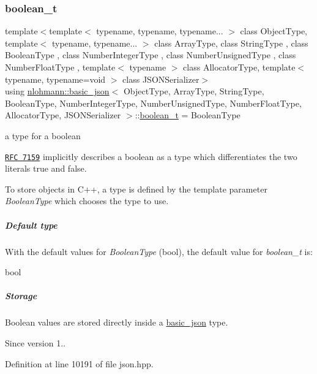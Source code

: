 \subsubsection{\texorpdfstring{boolean\+\_\+t}{boolean\_t}}
{\footnotesize\ttfamily template$<$template$<$ typename, typename, typename... $>$ class Object\+Type, template$<$ typename, typename... $>$ class Array\+Type, class String\+Type , class Boolean\+Type , class Number\+Integer\+Type , class Number\+Unsigned\+Type , class Number\+Float\+Type , template$<$ typename $>$ class Allocator\+Type, template$<$ typename, typename=void $>$ class J\+S\+O\+N\+Serializer$>$ \\
using \hyperlink{classnlohmann_1_1basic__json}{nlohmann\+::basic\+\_\+json}$<$ Object\+Type, Array\+Type, String\+Type, Boolean\+Type, Number\+Integer\+Type, Number\+Unsigned\+Type, Number\+Float\+Type, Allocator\+Type, J\+S\+O\+N\+Serializer $>$\+::\hyperlink{classnlohmann_1_1basic__json_a4c919102a9b4fe0d588af64801436082}{boolean\+\_\+t} =  Boolean\+Type}



a type for a boolean 

\href{http://rfc7159.net/rfc7159}{\tt R\+FC 7159} implicitly describes a boolean as a type which differentiates the two literals {\ttfamily true} and {\ttfamily false}.

To store objects in C++, a type is defined by the template parameter {\itshape Boolean\+Type} which chooses the type to use.

\subparagraph*{Default type}

With the default values for {\itshape Boolean\+Type} ({\ttfamily bool}), the default value for {\itshape boolean\+\_\+t} is\+:


\begin{DoxyCode}
\textcolor{keywordtype}{bool}
\end{DoxyCode}


\subparagraph*{Storage}

Boolean values are stored directly inside a \hyperlink{classnlohmann_1_1basic__json}{basic\+\_\+json} type.

\begin{DoxySince}{Since}
version 1.. 
\end{DoxySince}


Definition at line 10191 of file json.\+hpp.

\mbox{\label{classnlohmann_1_1basic__json_a41a70cf9993951836d129bb1c2b3126a}} 
